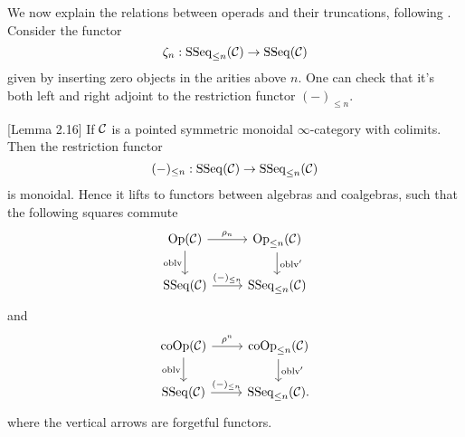 We now explain the relations between operads and their truncations, following \cite{Heuts_Koszul}.
Consider the functor 
$$
\zeta_n: \operatorname{SSeq}_{\leq n}({\mathcal{C}}) \to \operatorname{SSeq}({\mathcal{C}})
$$
given by inserting zero objects in the arities above $n$. One can check that it's both left and right adjoint to the restriction functor
$
(-)_{\leq n}.
$

\begin{lemma}
	\cite{Hadrianphdthesis}[Lemma 2.16]
	If ${\mathcal{C}}$ is a pointed symmetric monoidal $\infty$-category with colimits.
	Then the restriction functor
$$
(-)_{\leq n}: \operatorname{SSeq}({\mathcal{C}}) \to 
\operatorname{SSeq}_{\leq n}({\mathcal{C}})
$$
	is monoidal. Hence it lifts to functors between algebras and coalgebras,
	such that the following squares commute
\[
\begin{tikzcd}
	\Opd(\CC)  & 
	\operatorname{Op}_{\leq n}(\CC)\\
	\SSeq(\CC) & \SSeq_{\leq n}(\CC)
	\arrow[from=1-1, to= 1-2, "\rho_n"]
	\arrow[from=1-1, to=2-1, "\oblv" left]
	\arrow[from=1-2, to=2-2, "\oblv'" ]
	\arrow[from=2-1, to= 2-2, "(-)_{\leq n}"]
\end{tikzcd}
\]
and
\[
\begin{tikzcd}
	 \Coop(\CC)  & 
	\operatorname{coOp}_{\leq n}(\CC)\\
	\SSeq(\CC) & \SSeq_{\leq n}(\CC)
	\arrow[from=1-1, to= 1-2, "\rho^n"]
	\arrow[from=1-1, to=2-1, "\oblv" left]
	\arrow[from=1-2, to=2-2, "\oblv'" ]
	\arrow[from=2-1, to= 2-2, "(-)_{\leq n}"].
\end{tikzcd}
\]
where the vertical arrows are forgetful functors.
\end{lemma}

